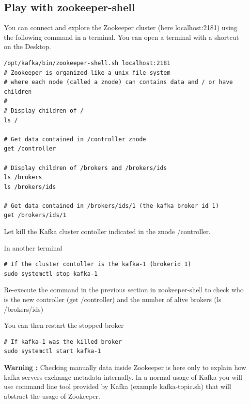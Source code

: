 \documentclass{article}
\newenvironment{warning}
    { \begin{mdframed}[backgroundcolor=blue!20] \textbf{Warning : } }
    {  \end{mdframed}}
\newenvironment{code}
    { \begin{mdframed} }    {  \end{mdframed}}
\begin{document}
\subsection{Play with zookeeper-shell}

You can connect and explore the Zookeeper cluster (here localhost:2181) using the following command in a terminal. You can open a terminal with a shortcut on the Desktop.
\begin{code}
    \begin{verbatim}
/opt/kafka/bin/zookeeper-shell.sh localhost:2181
# Zookeeper is organized like a unix file system 
# where each node (called a znode) can contains data and / or have children
# 
# Display children of /
ls /

# Get data contained in /controller znode
get /controller

# Display children of /brokers and /brokers/ids
ls /brokers
ls /brokers/ids

# Get data contained in /brokers/ids/1 (the kafka broker id 1)
get /brokers/ids/1
    \end{verbatim}
\end{code}

Let kill the Kafka cluster contoller indicated in the znode /controller.


In another terminal

\begin{code}
    \begin{verbatim}
# If the cluster contoller is the kafka-1 (brokerid 1)
sudo systemctl stop kafka-1
    \end{verbatim}
\end{code}

Re-execute the command in the previous section in zookeeper-shell to check who is the new controller (get /controller) and the number of alive brokers (ls /brokers/ids)

You can then restart the stopped broker

\begin{code}
    \begin{verbatim}
# If kafka-1 was the killed broker
sudo systemctl start kafka-1
    \end{verbatim}
\end{code}

\begin{warning}
Checking manually data inside Zookeeper is here only to explain how kafka servers exchange metadata internally. In a normal usage of Kafka you will use command line tool provided by Kafka (example kafka-topic.sh) that will abstract the usage of Zookeeper.
\end{warning}
\end{document}
